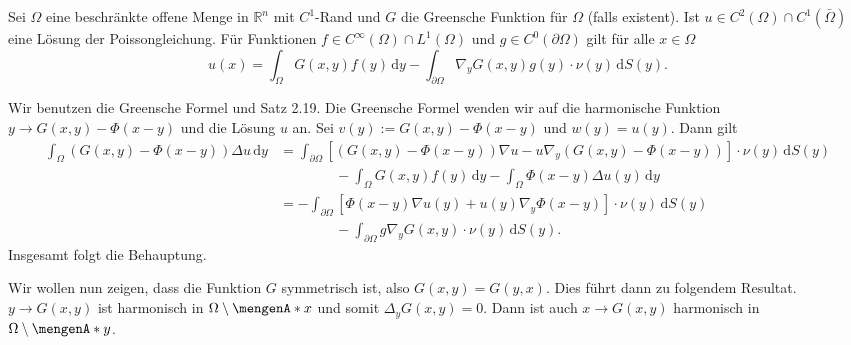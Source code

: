 \begin{satz}
	Sei $\Omega$ eine beschränkte offene Menge in $\mathbb{R}^n$ mit $C^1$-Rand und $G$ die Greensche Funktion für $\Omega$ (falls existent). 
	Ist $u \in C^2(\Omega) \cap C^1(\bar{\Omega})$ eine Lösung der Poissongleichung. 
	Für Funktionen $f \in C^{\infty}(\Omega) \cap L^1(\Omega)$ und $g \in C^0(\partial \Omega)$ gilt für alle $x \in \Omega$
	\[
		u(x) = \int_{\Omega}^{} G(x,y)f(y) \,\mathrm{d}y - \int_{\partial \Omega}^{}  \nabla_y G(x,y) g(y) \cdot \nu(y) \,\mathrm{d}S(y).
	\]
\end{satz}
\begin{beweis}
	Wir benutzen die Greensche Formel und Satz 2.19. Die Greensche Formel wenden wir auf die harmonische Funktion $y \to G(x,y) - \Phi(x-y)$ und die Lösung $u$ an. 
	Sei $v(y):= G(x,y) - \Phi(x-y)$ und $w(y)= u(y)$. Dann gilt
	\begin{align*}
		\int_{\Omega}^{}(G(x,y)-\Phi(x-y)) \Delta u \,\mathrm{d}y 
		&= \int_{\partial \Omega}^{} \left[ (G(x,y)- \Phi(x-y))  \nabla u - u  \nabla_y (G(x,y)-\Phi(x-y)) \right] \cdot \nu(y)  \,\mathrm{d}S(y) \\
		& \qquad \qquad - \int_{\Omega}^{} G(x,y)f(y) \,\mathrm{d}y - \int_{\Omega}^{} \Phi(x-y) \Delta u(y) \,\mathrm{d}y  \\
		& = - \int_{\partial \Omega}^{} \left[ \Phi(x-y)  \nabla u(y) + u(y)  \nabla_y \Phi(x-y) \right] \cdot \nu(y)  \,\mathrm{d}S(y) \\
		& \qquad \qquad -\int_{\partial \Omega}^{} g  \nabla_y G(x,y) \cdot \nu(y)  \,\mathrm{d}S(y).		
	\end{align*}
	Insgesamt folgt die Behauptung.
\end{beweis}
Wir wollen nun zeigen, dass die Funktion $G$ symmetrisch ist, also $G(x,y)=G(y,x)$. Dies führt dann zu folgendem Resultat.
$y \to G(x,y)$ ist harmonisch in $\Omega \setminus \set{x}$ und somit $ \Delta_y G(x,y)=0$. Dann ist auch $x \to G(x,y)$ harmonisch in $\Omega \setminus \set{y}$.


